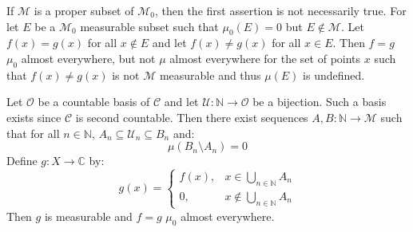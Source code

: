 \documentclass[crop=false,class=article]{standalone}                           %
\begin{document}
        \begin{solution}
            If $\mathcal{M}$ is a proper subset of $\mathcal{M}_{0}$, then the
            first assertion is not necessarily true. For let $E$ be a
            $\mathcal{M}_{0}$ measurable subset such that $\mu_{0}(E)=0$ but
            $E\notin\mathcal{M}$. Let $f(x)=g(x)$ for all $x\notin{E}$ and let
            $f(x)\ne{g}(x)$ for all $x\in{E}$. Then $f=g$ $\mu_{0}$ almost
            everywhere, but not $\mu$ almost everywhere for the set of
            points $x$ such that $f(x)\ne{g}(x)$ is not $\mathcal{M}$ measurable
            and thus $\mu(E)$ is undefined.
            \par\hfill\par
            Let $\mathcal{O}$ be a countable basis of $\mathcal{C}$ and let
            $\mathcal{U}:\mathbb{N}\rightarrow\mathcal{O}$ be a bijection. Such
            a basis exists since $\mathcal{C}$ is second countable. Then there
            exist sequences $A,B:\mathbb{N}\rightarrow\mathcal{M}$ such that
            for all $n\in\mathbb{N}$,
            $A_{n}\subseteq\mathcal{U}_{n}\subseteq{B}_{n}$ and:
            \begin{equation}
                \mu(B_{n}\setminus{A}_{n})=0
            \end{equation}
            Define $g:X\rightarrow\mathbb{C}$ by:
            \begin{equation}
                g(x)=
                \begin{cases}
                    f(x),&x\in\bigcup_{n\in\mathbb{N}}A_{n}\\
                    0,&x\notin\bigcup_{n\in\mathbb{N}}A_{n}
                \end{cases}
            \end{equation}
            Then $g$ is measurable and $f=g$ $\mu_{0}$ almost everywhere.
        \end{solution}
\end{document}
